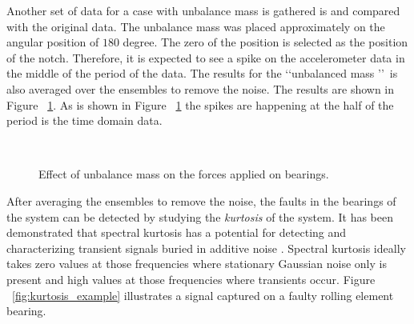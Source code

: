 \documentclass[paper=a4, fontsize=12pt]{scrartcl} %
\begin{document}
%
Another set of data for a case with unbalance mass is gathered is and compared with the original data. The unbalance mass was placed approximately on the angular position of $180$ degree. The zero of the position is selected as the position of the notch. Therefore, it is expected to see a spike on the accelerometer data in the middle of the period of the data. The results for the \lq\lq unbalanced mass \rq\rq\ is also averaged over the ensembles to remove the noise. The results are shown in Figure ~\ref{fig:unbalanceMassTimeDomain}. As is shown in Figure ~\ref{fig:unbalanceMassTimeDomain} the spikes are happening at the half of the period is the time domain data.
%
\begin{figure}[H]
	\centering
	\\
	\caption{Effect of unbalance mass on the forces applied on bearings.}
	\label{fig:unbalanceMassTimeDomain}
\end{figure}
%
After averaging the ensembles to remove the noise, the faults in the bearings of the system can be detected by studying the \emph{kurtosis} of the system. It has been demonstrated that spectral kurtosis has a potential for detecting and characterizing transient signals buried in additive noise \cite{antoni2006spectral}. Spectral kurtosis ideally takes zero values at those frequencies where stationary Gaussian noise only is present and high values at those frequencies where transients occur. Figure ~\ref{fig:kurtosis_example} illustrates a signal captured on a faulty rolling element bearing.\\
\end{document}
